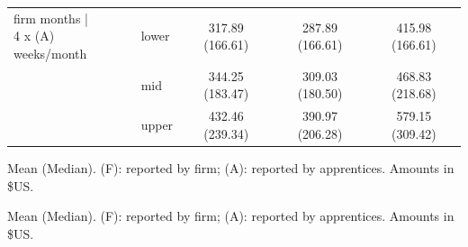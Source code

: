 \documentclass[
  11pt,
a4paper
]{report}
\begin{document}
\begin{table}[H]
\begin{threeparttable}
{\begin{tabular}[t]{llccc}
\makecell[l]{firm months |\\ 4 x (A) weeks/month} & lower & 317.89 (166.61) & 287.89 (166.61) & 415.98 (166.61)\\
 & mid & 344.25 (183.47) & 309.03 (180.50) & 468.83 (218.68)\\
 & upper & 432.46 (239.34) & 390.97 (206.28) & 579.15 (309.42)\\
\bottomrule
\end{tabular}}
\begin{tablenotes}
\small
\item Mean (Median). (F): reported by firm; (A): reported by apprentices. Amounts in \$US.
\end{tablenotes}
\end{threeparttable}
\end{table}

\begin{table}[H]

\caption{\label{tab:tbl-allowboundsapp}Allowances per apprentice per year, reported by apprentice}
\centering
\begin{threeparttable}
\begin{tablenotes}
\small
\item Mean (Median). (F): reported by firm; (A): reported by apprentices. Amounts in \$US.
\end{tablenotes}
\end{threeparttable}
\end{table}
\end{document}
